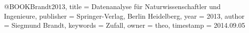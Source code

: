 @BOOK{Brandt2013,
  title = {Datenanalyse für Naturwissenschaftler und Ingenieure},
  publisher = {Springer-Verlag, Berlin Heidelberg},
  year = {2013},
  author = {Siegmund Brandt},
  keywords = {Zufall},
  owner = {theo},
  timestamp = {2014.09.05}
}
